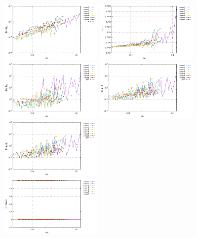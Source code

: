 \begin{center}
\includegraphics[width=5cm]{python_codes/fieldstone_78/results/errors_u_exp14.pdf}
\includegraphics[width=5cm]{python_codes/fieldstone_78/results/vrms_exp14.pdf} \\
\includegraphics[width=5cm]{python_codes/fieldstone_78/results/errors_p_exp14.pdf}
\includegraphics[width=5cm]{python_codes/fieldstone_78/results/errors_q1_exp14.pdf}
\includegraphics[width=5cm]{python_codes/fieldstone_78/results/errors_q2_exp14.pdf}\\
\includegraphics[width=5cm]{python_codes/fieldstone_78/results/stats_u_exp14.pdf}

\end{center}
